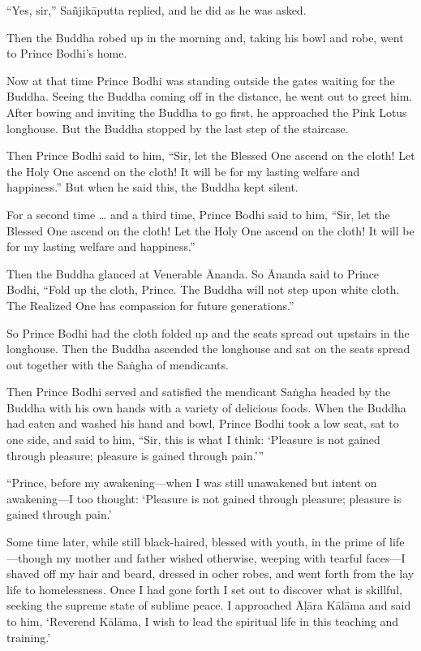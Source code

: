\documentclass[12pt,openany]{book}%
\begin{document}
“Yes, sir,” \textsanskrit{Sañjikāputta} replied, and he did as he was asked. 

Then the Buddha robed up in the morning and, taking his bowl and robe, went to Prince Bodhi’s home. 

Now at that time Prince Bodhi was standing outside the gates waiting for the Buddha. Seeing the Buddha coming off in the distance, he went out to greet him. After bowing and inviting the Buddha to go first, he approached the Pink Lotus longhouse. But the Buddha stopped by the last step of the staircase. 

Then Prince Bodhi said to him, “Sir, let the Blessed One ascend on the cloth! Let the Holy One ascend on the cloth! It will be for my lasting welfare and happiness.” But when he said this, the Buddha kept silent. 

For a second time … and a third time, Prince Bodhi said to him, “Sir, let the Blessed One ascend on the cloth! Let the Holy One ascend on the cloth! It will be for my lasting welfare and happiness.” 

Then the Buddha glanced at Venerable Ānanda. So Ānanda said to Prince Bodhi, “Fold up the cloth, Prince. The Buddha will not step upon white cloth. The Realized One has compassion for future generations.” 

So Prince Bodhi had the cloth folded up and the seats spread out upstairs in the longhouse. Then the Buddha ascended the longhouse and sat on the seats spread out together with the \textsanskrit{Saṅgha} of mendicants. 

Then Prince Bodhi served and satisfied the mendicant \textsanskrit{Saṅgha} headed by the Buddha with his own hands with a variety of delicious foods. When the Buddha had eaten and washed his hand and bowl, Prince Bodhi took a low seat, sat to one side, and said to him, “Sir, this is what I think: ‘Pleasure is not gained through pleasure; pleasure is gained through pain.’” 

“Prince, before my awakening—when I was still unawakened but intent on awakening—I too thought: ‘Pleasure is not gained through pleasure; pleasure is gained through pain.’ 

Some time later, while still black-haired, blessed with youth, in the prime of life—though my mother and father wished otherwise, weeping with tearful faces—I shaved off my hair and beard, dressed in ocher robes, and went forth from the lay life to homelessness. Once I had gone forth I set out to discover what is skillful, seeking the supreme state of sublime peace. I approached \textsanskrit{Āḷāra} \textsanskrit{Kālāma} and said to him, ‘Reverend \textsanskrit{Kālāma}, I wish to lead the spiritual life in this teaching and training.’ 
\end{document}
